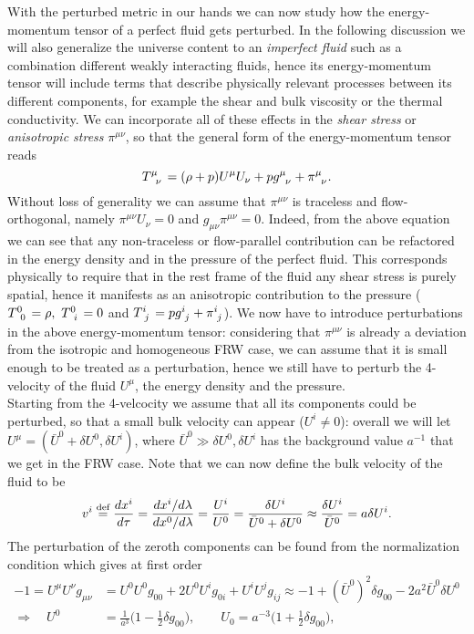 With the perturbed metric in our hands we can now study how the energy-momentum tensor of a perfect fluid gets perturbed. In the following discussion we will also generalize the universe content to an \emph{imperfect fluid} such as a combination different weakly interacting fluids, hence its energy-momentum tensor will include terms that describe physically relevant processes between its different components, for example the shear and bulk viscosity or the thermal conductivity. We can incorporate all of these effects in the \emph{shear stress} or \emph{anisotropic stress} $\pi^{\mu\nu}$, so that the general form of the energy-momentum tensor reads
\begin{equation}
    \tensor{T}{^\mu_\nu}=(\rho+p)U^\mu U_\nu+p\tensor{g}{^\mu_\nu}+\tensor{\pi}{^\mu_\nu}.
    \label{eq:Generalized_stress-energy_Tensor}
\end{equation}
Without loss of generality we can assume that $\pi^{\mu\nu}$ is traceless and flow-orthogonal, namely $\pi^{\mu\nu}U_\nu=0$ and $g_{\mu\nu}\pi^{\mu\nu}=0$. Indeed, from the above equation we can see that any non-traceless or flow-parallel contribution can be refactored in the energy density and in the pressure of the perfect fluid. This corresponds physically to require that in the rest frame of the fluid any shear stress is purely spatial, hence it manifests as an anisotropic contribution to the pressure ($\tensor{T}{^0_0}=\rho,\ \tensor{T}{^0_i}=0$ and $\tensor{T}{^i_j}=p\tensor{g}{^i_j}+\tensor{\pi}{^i_j}$). We now have to introduce perturbations in the above energy-momentum tensor: considering that $\pi^{\mu\nu}$ is already a deviation from the isotropic and homogeneous FRW case, we can assume that it is small enough to be treated as a perturbation, hence we still have to perturb the 4-velocity of the fluid $U^\mu$, the energy density and the pressure. \\ Starting from the 4-velcocity we assume that all its components could be perturbed, so that a small bulk velocity can appear ($U^i\neq0$): overall we will let $U^\mu=(\bar U^0+\delta U^0,\delta U^i)$, where $\bar U^0\gg\delta U^0,\delta U^i$ has the background value $a^{-1}$ that we get in the FRW case. Note that we can now define the bulk velocity of the fluid to be 
$$
v^i\stackrel{\text{def}}{=}\frac{d x^i}{d\tau}=\frac{dx^i/d\lambda}{dx^0/d\lambda}=\frac{U^i}{U^0}=\frac{\delta U^i}{\bar U^0+\delta U^0}\approx \frac{\delta U^i}{\bar U^0}=a\delta U^i.
$$
The perturbation of the zeroth components can be found from the normalization condition which gives at first order
\begin{align*}
    -1=U^\mu U^{\nu}g_{\mu\nu}&=U^0U^0g_{00}+2U^0U^i g_{0i}+U^i U^j g_{ij}\approx -1+(\bar U^0)^2\delta g_{00}-2a^2\bar U^0\delta U^0\\
    \Rightarrow\quad U^0&=\frac{1}{a^3}\bigg(1-\frac{1}{2}\delta g_{00}\bigg),\qquad U_0=a^{-3}\bigg(1+\frac{1}{2}\delta g_{00}\bigg),
\end{align*}
